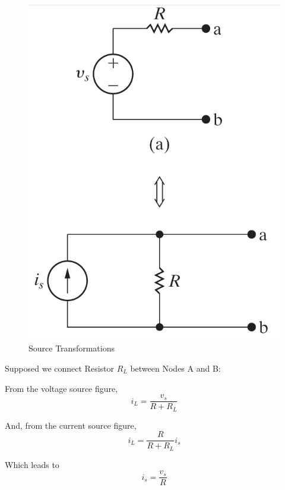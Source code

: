 \documentclass[14pt]{memoir}
\begin{document}
\begin{figure}[H]
\begin{center}
\includegraphics[scale=0.50]{fig/fig04_38.png}
\caption{Source Transformations}
\label{fig:fig04_38}
\end{center}
\end{figure}


Supposed we connect Resistor $R_L$ between Nodes A and B:

From the voltage source figure,
\begin{equation}
i_L = \frac{v_s}{R + R_L}
\end{equation}

And, from the current source figure,
\begin{equation}
i_L = \frac{R}{R + R_L} i_s
\end{equation}

Which leads to
\begin{equation}
i_s = \frac{v_s}{R}
\end{equation}
\end{document}
